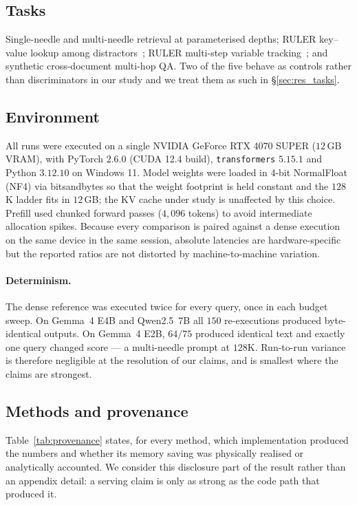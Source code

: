 \documentclass{article}
\theoremstyle{definition}
\begin{document}
\subsection{Tasks}
Single-needle and multi-needle retrieval at parameterised depths; RULER key--value lookup among distractors~\citep{hsieh2024ruler}; RULER multi-step variable tracking~\citep{hsieh2024ruler}; and synthetic cross-document multi-hop QA. Two of the five behave as controls rather than discriminators in our study and we treat them as such in \S\ref{sec:res_tasks}.

\subsection{Environment}
All runs were executed on a single NVIDIA GeForce RTX 4070 SUPER ($12$\,GB VRAM), with PyTorch $2.6.0$ (CUDA 12.4 build), \texttt{transformers} $5.15.1$ and Python $3.12.10$ on Windows 11. Model weights were loaded in 4-bit NormalFloat (NF4) via bitsandbytes so that the weight footprint is held constant and the $128$K ladder fits in $12$\,GB; the KV cache under study is unaffected by this choice. Prefill used chunked forward passes ($4{,}096$ tokens) to avoid intermediate allocation spikes. Because every comparison is paired against a dense execution on the same device in the same session, absolute latencies are hardware-specific but the reported ratios are not distorted by machine-to-machine variation.

\paragraph{Determinism.} The dense reference was executed twice for every query, once in each budget sweep. On Gemma~4 E4B and Qwen2.5~7B all $150$ re-executions produced byte-identical outputs. On Gemma~4 E2B, $64/75$ produced identical text and exactly one query changed score --- a multi-needle prompt at $128$K. Run-to-run variance is therefore negligible at the resolution of our claims, and is smallest where the claims are strongest.

\subsection{Methods and provenance}
\label{sec:provenance}

Table~\ref{tab:provenance} states, for every method, which implementation produced the numbers and whether its memory saving was physically realised or analytically accounted. We consider this disclosure part of the result rather than an appendix detail: a serving claim is only as strong as the code path that produced it.
\end{document}
